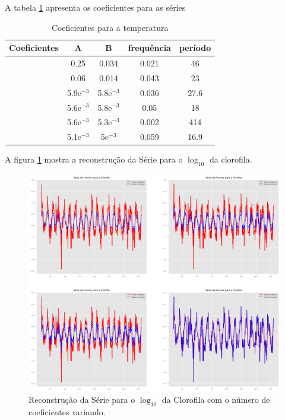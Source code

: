 \documentclass[12pt,a4paper,portuguese]{article}
\begin{document}
A tabela \ref{Coeficientes para a t} apresenta os coeficientes para as séries
\begin{table}[H]
\centering

\begin{tabular}{|c|c|c|c|c|}
	\hline
	Coeficientes & A & B & frequência & período \\
	\hline
	& 0.25 & 0.034 & 0.021 &  46\\
	\hline
	&   0.06 &0.014 &  0.043 & 23 \\
	\hline
	& 5.9e$^{-3}$& 5.8e$^{-3}$ & 0.036 & 27.6  \\
	\hline
	& 5.6e$^{-3}$ & 5.8e$^{-3}$ &  0.05 & 18\\
	\hline
	& 5.6e$^{-3}$& 5.3e$^{-3}$& 0.002 & 414 \\
	\hline
	& 5.1e$^{-3}$ & 5e$^{-3}$& 0.059 & 16.9 \\
	\hline
\end{tabular}
\caption{Coeficientes para a temperatura}
\label{Coeficientes para a t}
\end{table}
A figura \ref{fig:lista4-3d} mostra a reconstrução da Série para o $\log_{10}$ da clorofila.
\begin{figure}[H]
	\centering
	\includegraphics[width=1\linewidth]{lista4-3d}
	\caption{Reconstrução da Série para o $\log_{10}$ da Clorofila com o número de coeficientes variando.}
	\label{fig:lista4-3d}
\end{figure}
	
\end{document}
